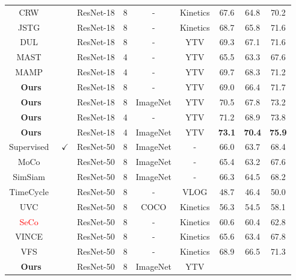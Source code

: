 \documentclass{article}
\begin{document}
\begin{table}[t]
{\begin{tabular}{ccccccccc}
      CRW~\cite{jabri2020space} & & ResNet-18 & 8 & - & Kinetics
			& 67.6 & 64.8  & 70.2  \\
			JSTG~\cite{zhao2021modelling} & & ResNet-18 & 8 & - & Kinetics
			& 68.7 & 65.8   & 71.6  \\
      DUL~\cite{araslanov2021dense} & & ResNet-18 & 8 & - & YTV
			& 69.3 & 67.1   & 71.6  \\
      MAST~\cite{lai2020mast} & & ResNet-18 & 4 & - & YTV
			& 65.5 & 63.3  & 67.6  \\
      MAMP~\cite{miao2021self} & & ResNet-18 & 4 & - & YTV
			& 69.7 & 68.3   & 71.2  \\
      \hline
			\textbf{Ours} & & ResNet-18 & 8 & - & YTV
			& 69.0 & 66.4 & 71.7 \\
      \textbf{Ours} & & ResNet-18 & 8 & ImageNet & YTV
			& 70.5   & 67.8 & 73.2 \\
      \textbf{Ours} & & ResNet-18 & 4 & - & YTV
			& 71.2  & 68.9 & 73.8 \\
      \textbf{Ours} & & ResNet-18 & 4 & ImageNet & YTV
			& \textbf{73.1} & \textbf{70.4} & \textbf{75.9} \\
			\hline
      \hline
      Supervised~\cite{he2016deep} & $\checkmark$& ResNet-50 & 8 & ImageNet &-
			& 66.0 & 63.7  & 68.4  \\
      MoCo~\cite{he2020momentum} & & ResNet-50 & 8 & ImageNet &-
			& 65.4 & 63.2  & 67.6  \\
      SimSiam~\cite{chen2021exploring} & & ResNet-50 & 8 & ImageNet &-
			& 66.3 & 64.5  & 68.2  \\
      TimeCycle~\cite{wang2019learning} & & ResNet-50 & 8 & - & VLOG
			& 48.7 & 46.4  & 50.0  \\
      UVC~\cite{li2019joint}  & & ResNet-50 & 8 & COCO & Kinetics
			& 56.3 & 54.5  & 58.1  \\
      \textcolor{red}{SeCo}~\cite{yao2021seco} & & ResNet-50 & 8 & - & Kinetics
			& 60.6 & 60.4  & 62.8  \\
      VINCE~\cite{gordon2020watching} & & ResNet-50 & 8 & - & Kinetics
			& 65.6 & 63.4  & 67.8  \\
      VFS~\cite{xu2021rethinking}  & & ResNet-50 & 8 & - & Kinetics
			& 68.9 & 66.5 & 71.3    \\
      \hline
      \textbf{Ours} & & ResNet-50 & 8 & ImageNet & YTV

\end{tabular}}
\end{table}
\end{document}
